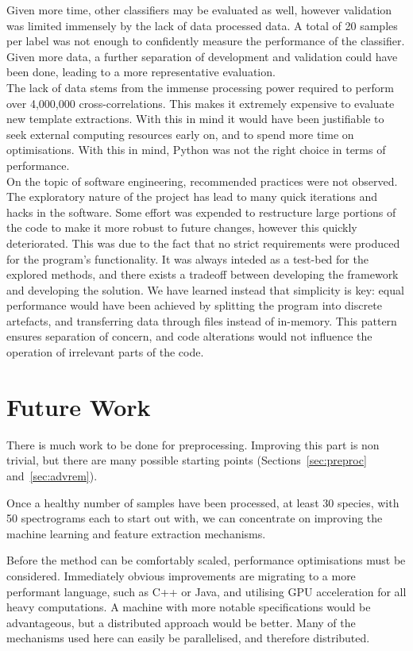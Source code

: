 Given more time, other classifiers may be evaluated as well,
however validation was limited immensely by the lack of data processed data.
A total of 20 samples per label was not enough to confidently measure the
performance of the classifier.
Given more data, a further separation of development and validation could have
been done, leading to a more representative evaluation.\\

The lack of data stems from the immense processing power required to
perform over 4,000,000 cross-correlations.
This makes it extremely expensive to evaluate new template extractions.
With this in mind it would have been justifiable to seek external computing
resources early on, and to spend more time on optimisations.
With this in mind, Python was not the right choice in terms of performance.\\


On the topic of software engineering, recommended practices were not observed.
The exploratory nature of the project has lead to many quick iterations and hacks
in the software.
Some effort was expended to restructure large portions of the code to make it
more robust to future changes, however this quickly deteriorated.
This was due to the fact that no strict requirements were produced for the
program's functionality.
It was always inteded as a test-bed for the explored methods, and there exists
a tradeoff between developing the framework and developing the solution.
We have learned instead that simplicity is key: equal performance would have
been achieved by splitting the program into discrete artefacts, and transferring
data through files instead of in-memory.
This pattern ensures separation of concern, and code alterations would not
influence the operation of irrelevant parts of the code.


\section{Future Work}

There is much work to be done for preprocessing.
Improving  this part is non trivial, but there are many possible starting points
(Sections~\ref{sec:preproc} and~\ref{sec:advrem}).

Once a healthy number of samples have been processed, at least 30 species, with
50 spectrograms each to start out with, we can concentrate on
improving the machine learning and feature extraction mechanisms.

Before the method can be comfortably scaled, performance optimisations must be
considered.
Immediately obvious improvements are migrating to a more performant language,
such as C++ or Java, and utilising GPU acceleration for all heavy computations.
A machine with more notable specifications would be advantageous, but a
distributed approach would be better.
Many of the mechanisms used here can easily be parallelised, and therefore
distributed.


